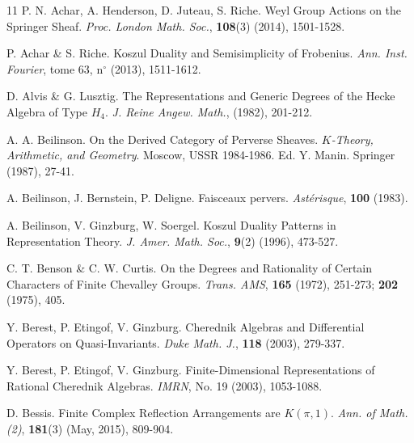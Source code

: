 \documentclass[a4paper,10pt,leqno]{amsart}
\theoremstyle{plain}
\theoremstyle{plain}
\theoremstyle{plain}
\theoremstyle{definition}
\theoremstyle{remark}
\begin{document}
\newpage
\frenchspacing
\begin{thebibliography}{11}
	P. N. Achar, A. Henderson, D. Juteau, S. Riche.
	Weyl Group Actions on the Springer Sheaf.
	\textsl{Proc. London Math. Soc.},
	\textbf{108}(3)
	(2014),
	1501-1528.

	P. Achar \& S. Riche.
	Koszul Duality and Semisimplicity of Frobenius.
	\textsl{Ann. Inst. Fourier},
	tome 63, n${}^\circ$
	(2013),
	1511-1612.

	D. Alvis \& G. Lusztig.
	The Representations and Generic Degrees of the Hecke Algebra of Type $H_4$.
	\textsl{J. Reine Angew. Math.},
	(1982),
	201-212.

	A. A. Beilinson.
	On the Derived Category of Perverse Sheaves.
	\textsl{$K$-Theory, Arithmetic, and Geometry}.
	Moscow, USSR 1984-1986.
	Ed. Y. Manin.
	Springer
	(1987),
	27-41.

	A. Beilinson, J. Bernstein, P. Deligne.
	Faisceaux pervers.
	\textsl{Ast\'erisque},
	\textbf{100}
	(1983).
	
	A. Beilinson, V. Ginzburg, W. Soergel.
	Koszul Duality Patterns in Representation Theory.
	\textsl{J. Amer. Math. Soc.},
	\textbf{9}(2)
	(1996),
	473-527.
	
	

	C. T. Benson \& C. W. Curtis.
	On the Degrees and Rationality of Certain Characters of Finite Chevalley Groups.
	\textsl{Trans. AMS},
	\textbf{165}
	(1972),
	251-273;
	\textbf{202}
	(1975),
	405.
	
	Y. Berest, P. Etingof, V. Ginzburg.
	Cherednik Algebras and Differential Operators on Quasi-Invariants.
	\textsl{Duke Math. J.},
	\textbf{118}
	(2003),
	279-337.

	Y. Berest, P. Etingof, V. Ginzburg.
	Finite-Dimensional Representations of Rational Cherednik Algebras.
	\textsl{IMRN},
	No. 19
	(2003),
	1053-1088.

	D. Bessis.
	Finite Complex Reflection Arrangements are $K(\pi, 1)$.
	\textsl{Ann. of Math. (2)},
	\textbf{181}(3)
	(May, 2015),
	809-904.
	

\end{thebibliography}
\end{document}
